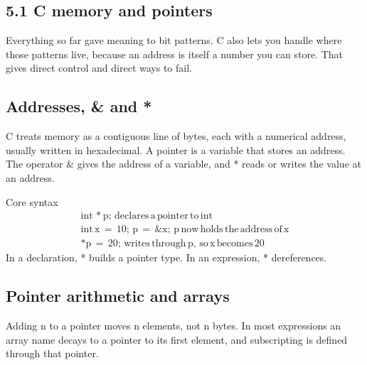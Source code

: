 \documentclass[11pt]{article}
\begin{document}
\begin{keepsection}
\section{5.1 C memory and pointers}

Everything so far gave meaning to bit patterns. C also lets you handle where those patterns live, because an address is itself a number you can store. That gives direct control and direct ways to fail.

\begin{keepsection}
\subsection{Addresses, \& and *}

C treats memory as a contiguous line of bytes, each with a numerical address, usually written in hexadecimal. A pointer is a variable that stores an address. The operator \& gives the address of a variable, and * reads or writes the value at an address.

\begin{equationcard}{Core syntax}
\[ \begin{gathered} \text{int}\, *\mathrm{p};\, \text{declares}\, \mathrm{a}\, \text{pointer}\, \text{to}\, \text{int} \\ \text{int}\, \mathrm{x}\, =\, 10;\, \mathrm{p}\, =\, \&\mathrm{x};\, \mathrm{p}\, \text{now}\, \text{holds}\, \text{the}\, \text{address}\, \text{of}\, \mathrm{x} \\ *\mathrm{p}\, =\, 20;\, \text{writes}\, \text{through}\, \mathrm{p},\, \text{so}\, \mathrm{x}\, \text{becomes}\, 20 \end{gathered} \]
{\small In a declaration, * builds a pointer type. In an expression, * dereferences.}
\end{equationcard}
\end{keepsection}

\begin{keepsection}
\subsection{Pointer arithmetic and arrays}

Adding n to a pointer moves n elements, not n bytes. In most expressions an array name decays to a pointer to its first element, and subscripting is defined through that pointer.


\end{keepsection}
\end{keepsection}
\end{document}
